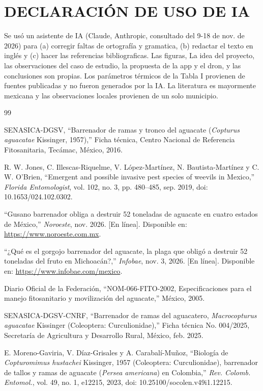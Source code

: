 \documentclass[conference]{IEEEtran}
\begin{document}
\section*{DECLARACIÓN DE USO DE IA}
Se usó un asistente de IA (Claude, Anthropic, consultado del 9-18 de nov. de 2026) para (a) corregir faltas de ortografía y gramatica, (b) redactar el texto en inglés y (c) hacer las referencias bibliograficas. Las figuras, La idea del proyecto, las observaciones del caso de estudio, la propuesta de la app y el dron, y las conclusiones son propias. Los parámetros térmicos de la Tabla I provienen de fuentes publicadas y no fueron generados por la IA. La literatura es mayormente mexicana y las observaciones locales provienen de un solo municipio.
\newpage
\begin{thebibliography}{99}

 SENASICA-DGSV, ``Barrenador de ramas y tronco del aguacate (\textit{Copturus aguacatae} Kissinger, 1957),'' Ficha técnica, Centro Nacional de Referencia Fitosanitaria, Tecámac, México, 2016.

 R. W. Jones, C. Illescas-Riquelme, V. López-Martínez, N. Bautista-Martínez y C. W. O'Brien, ``Emergent and possible invasive pest species of weevils in Mexico,'' \textit{Florida Entomologist}, vol. 102, no. 3, pp. 480--485, sep. 2019, doi: 10.1653/024.102.0302.

 ``Gusano barrenador obliga a destruir 52 toneladas de aguacate en cuatro estados de México,'' \textit{Noroeste}, nov. 2026. [En línea]. Disponible en: \url{https://www.noroeste.com.mx}.

 ``¿Qué es el gorgojo barrenador del aguacate, la plaga que obligó a destruir 52 toneladas del fruto en Michoacán?,'' \textit{Infobae}, nov. 3, 2026. [En línea]. Disponible en: \url{https://www.infobae.com/mexico}.

 Diario Oficial de la Federación, ``NOM-066-FITO-2002, Especificaciones para el manejo fitosanitario y movilización del aguacate,'' México, 2005.

 SENASICA-DGSV-CNRF, ``Barrenador de ramas del aguacatero, \textit{Macrocopturus aguacatae} Kissinger (Coleoptera: Curculionidae),'' Ficha técnica No. 004/2025, Secretaría de Agricultura y Desarrollo Rural, México, feb. 2025.

 E. Moreno-Gaviria, V. Díaz-Grisales y A. Carabalí-Muñoz, ``Biología de \textit{Copturomimus hustachei} Kissinger, 1957 (Coleoptera: Curculionidae), barrenador de tallos y ramas de aguacate (\textit{Persea americana}) en Colombia,'' \textit{Rev. Colomb. Entomol.}, vol. 49, no. 1, e12215, 2023, doi: 10.25100/socolen.v49i1.12215.


\end{thebibliography}
\end{document}
